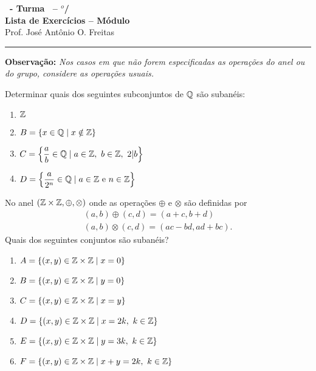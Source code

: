 \documentclass[12pt]{exam}
\begin{document}
    \begin{center}
    {\Large\bf \disciplina\ - Turma \turma\ -- \semestre$^{o}$/\ano} \\ \vspace{9pt} {\large\bf
        Lista de Exercícios -- Módulo \numeromodulo}\\ \vspace{9pt} Prof. José Antônio O. Freitas
    \end{center}

    \hrule

    \vspace{.6cm}

    \textbf{Observação: }\textit{Nos casos em que não forem especificadas as operações do anel ou do grupo, considere as operações usuais.}

    \vspace{.6cm}

    \questao{} Determinar quais dos seguintes subconjuntos de $\mathbb{Q}$ são subanéis:
        \begin{multicols}{2}
            \begin{enumerate}[label=({\alph*})]
                \item $\mathbb{Z}$
                \item $B = \{x \in \mathbb{Q} \mid x \notin \mathbb{Z}\}$
                \item $C = \left\{\dfrac{a}{b} \in \mathbb{Q} \mid a \in \mathbb{Z},\ b \in \mathbb{Z},\ 2 |b \right\}$
                \item $D = \left\{\dfrac{a}{2^n} \in \mathbb{Q} \mid a \in \mathbb{Z} \mbox{ e } n \in \mathbb{Z} \right\}$
            \end{enumerate}
        \end{multicols}

    \vspace{.3cm}

    \questao{} No anel $(\mathbb{Z} \times \mathbb{Z}, \oplus, \otimes)$ onde as operações $\oplus$ e $\otimes$ são definidas por
    \begin{align*}
        (a, b) \oplus (c, d) = (a + c, b + d)\\
        (a ,b) \otimes (c, d) = (ac - bd, ad + bc).
    \end{align*}
    Quais dos seguintes conjuntos são subanéis?
    \begin{enumerate}[label=({\alph*})]
        \item $A = \{(x, y) \in \mathbb{Z} \times \mathbb{Z} \mid x = 0\}$
        \item $B = \{(x, y) \in \mathbb{Z} \times \mathbb{Z} \mid y = 0\}$
        \item $C = \{(x, y) \in \mathbb{Z} \times \mathbb{Z} \mid x = y\}$
        \item $D = \{(x, y) \in \mathbb{Z} \times \mathbb{Z} \mid x = 2k,\ k \in \mathbb{Z}\}$
        \item $E = \{(x, y) \in \mathbb{Z} \times \mathbb{Z} \mid y = 3k,\ k \in \mathbb{Z}\}$
        \item $F = \{(x, y) \in \mathbb{Z} \times \mathbb{Z} \mid x + y = 2k,\ k \in \mathbb{Z}\}$
    \end{enumerate}
\end{document}
